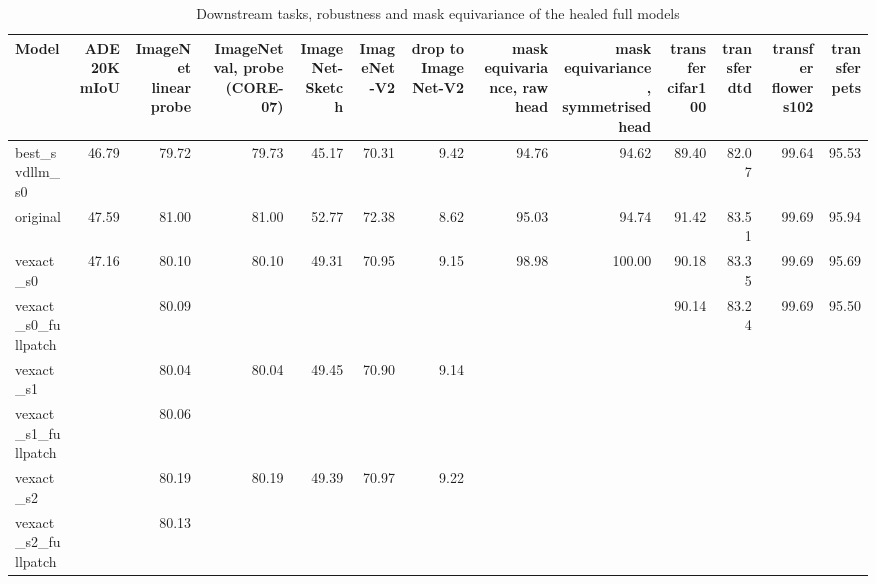 \begin{table}[t]
\centering
\small
\caption{Downstream tasks, robustness and mask equivariance of the healed full models}
\label{tab:table2_downstream}
\begin{tabular}{lrrrrrrrrrrrr}
\toprule
Model & ADE20K mIoU & ImageNet linear probe & ImageNet val, probe (CORE-07) & ImageNet-Sketch & ImageNet-V2 & drop to ImageNet-V2 & mask equivariance, raw head & mask equivariance, symmetrised head & transfer cifar100 & transfer dtd & transfer flowers102 & transfer pets \\
\midrule
best\_svdllm\_s0 & 46.79 & 79.72 & 79.73 & 45.17 & 70.31 & 9.42 & 94.76 & 94.62 & 89.40 & 82.07 & 99.64 & 95.53 \\
original & 47.59 & 81.00 & 81.00 & 52.77 & 72.38 & 8.62 & 95.03 & 94.74 & 91.42 & 83.51 & 99.69 & 95.94 \\
vexact\_s0 & 47.16 & 80.10 & 80.10 & 49.31 & 70.95 & 9.15 & 98.98 & 100.00 & 90.18 & 83.35 & 99.69 & 95.69 \\
vexact\_s0\_fullpatch &  & 80.09 &  &  &  &  &  &  & 90.14 & 83.24 & 99.69 & 95.50 \\
vexact\_s1 &  & 80.04 & 80.04 & 49.45 & 70.90 & 9.14 &  &  &  &  &  &  \\
vexact\_s1\_fullpatch &  & 80.06 &  &  &  &  &  &  &  &  &  &  \\
vexact\_s2 &  & 80.19 & 80.19 & 49.39 & 70.97 & 9.22 &  &  &  &  &  &  \\
vexact\_s2\_fullpatch &  & 80.13 &  &  &  &  &  &  &  &  &  &  \\
\bottomrule
\end{tabular}
\end{table}
